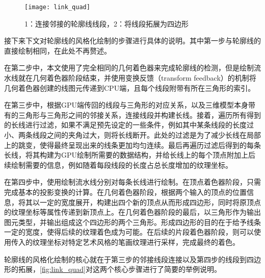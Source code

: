 \begin{figure}[tbh]
    \centering
    \texttt{[image: link\_quad]}
    \caption{\label{fig:link_quad}
    1：连接邻接的轮廓线线段，2：将线段拓展为四边形}
\end{figure}

接下来下文对轮廓线的风格化绘制的步骤进行具体的说明。其中第一步与轮廓线的直接绘制相同，在此处不再赘述。

在第二步中，本文使用了完全相同的几何着色器来完成轮廓线的检测，但是绘制流水线就在几何着色器阶段结束，并使用变换反馈（transform feedback）\cite{transformfeedback}的机制将几何着色器创建的线图元传递到CPU端，且每个线段附带有所在三角形的索引。

在第三步中，根据GPU端传回的线段与三角形的对应关系，以及三维模型本身带有的三角形与三角形之间的邻接关系，连接线段并构建长线。接着，遍历所有得到的长线进行过滤，如果不满足预先设定的一些条件，例如其中某条线段的长度过小、两条线段之间的夹角过大，则将长线断开。此处的过滤是为了减少长线在局部上的跳变，使得最终呈现出来的线条更加均匀连续。最后再遍历过滤后得到的每条长线，将其构建为GPU绘制所需要的数据结构，并给长线上的每个顶点附加上后续绘制需要的信息，例如随着每段线段的长度占总长度增加的纹理坐标。

在第四步中，使用绘制流水线分别对每条长线进行绘制。在顶点着色器阶段，只需完成基本的投影变换的计算。在几何着色器阶段，根据两个输入的顶点的位置信息，将其以一定的宽度展开，构建出四个新的顶点从而形成四边形，同时将原顶点的纹理坐标等属性传递到新顶点上。在几何着色器阶段的最后，以三角形作为输出图元类型，并输出组成这个四边形的两个三角形。形成四边形的目的在于给予线条一定的宽度，使得后续的纹理着色成为可能。在后续的片段着色器阶段，则可以使用传入的纹理坐标对特定艺术风格的笔画纹理进行采样，完成最终的着色。

轮廓线的风格化绘制的核心就在于第三步的邻接线段连接以及第四步的线段到四边形的拓展，\autoref{fig:link_quad}对这两个核心步骤进行了简要的举例说明。